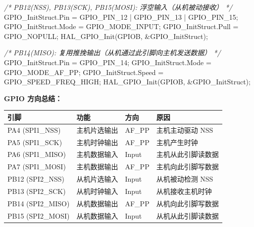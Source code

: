 \documentclass[
  chinese,
  UTF8,
  oneside,
  openany]{ctexbook}
\newenvironment{Shaded}{}{}
\newcommand{\CommentTok}[1]{\textcolor[rgb]{0.38,0.63,0.69}{\textit{#1}}}
\newcommand{\NormalTok}[1]{#1}
\newcommand{\OperatorTok}[1]{\textcolor[rgb]{0.40,0.40,0.40}{#1}}
\begin{document}
\begin{Shaded}
\begin{Highlighting}[]
\CommentTok{/* PB12(NSS), PB13(SCK), PB15(MOSI): 浮空输入（从机被动接收） */}
\NormalTok{GPIO\_InitStruct}\OperatorTok{.}\NormalTok{Pin   }\OperatorTok{=}\NormalTok{ GPIO\_PIN\_12 }\OperatorTok{|}\NormalTok{ GPIO\_PIN\_13 }\OperatorTok{|}\NormalTok{ GPIO\_PIN\_15}\OperatorTok{;}
\NormalTok{GPIO\_InitStruct}\OperatorTok{.}\NormalTok{Mode  }\OperatorTok{=}\NormalTok{ GPIO\_MODE\_INPUT}\OperatorTok{;}
\NormalTok{GPIO\_InitStruct}\OperatorTok{.}\NormalTok{Pull  }\OperatorTok{=}\NormalTok{ GPIO\_NOPULL}\OperatorTok{;}
\NormalTok{HAL\_GPIO\_Init}\OperatorTok{(}\NormalTok{GPIOB}\OperatorTok{,} \OperatorTok{\&}\NormalTok{GPIO\_InitStruct}\OperatorTok{);}

\CommentTok{/* PB14(MISO): 复用推挽输出（从机通过此引脚向主机发送数据） */}
\NormalTok{GPIO\_InitStruct}\OperatorTok{.}\NormalTok{Pin   }\OperatorTok{=}\NormalTok{ GPIO\_PIN\_14}\OperatorTok{;}
\NormalTok{GPIO\_InitStruct}\OperatorTok{.}\NormalTok{Mode  }\OperatorTok{=}\NormalTok{ GPIO\_MODE\_AF\_PP}\OperatorTok{;}
\NormalTok{GPIO\_InitStruct}\OperatorTok{.}\NormalTok{Speed }\OperatorTok{=}\NormalTok{ GPIO\_SPEED\_FREQ\_HIGH}\OperatorTok{;}
\NormalTok{HAL\_GPIO\_Init}\OperatorTok{(}\NormalTok{GPIOB}\OperatorTok{,} \OperatorTok{\&}\NormalTok{GPIO\_InitStruct}\OperatorTok{);}
\end{Highlighting}
\end{Shaded}

\textbf{GPIO 方向总结：}

\begin{longtable}[]{@{}llll@{}}
\toprule\noalign{}
引脚 & 功能 & 方向 & 原因 \\
\midrule\noalign{}
\endhead
\bottomrule\noalign{}
\endlastfoot
PA4 (SPI1\_NSS) & 主机片选输出 & AF\_PP & 主机主动驱动 NSS \\
PA5 (SPI1\_SCK) & 主机时钟输出 & AF\_PP & 主机产生时钟 \\
PA6 (SPI1\_MISO) & 主机数据输入 & Input & 主机从此引脚读数据 \\
PA7 (SPI1\_MOSI) & 主机数据输出 & AF\_PP & 主机向此引脚写数据 \\
PB12 (SPI2\_NSS) & 从机片选输入 & Input & 从机被动检测 NSS \\
PB13 (SPI2\_SCK) & 从机时钟输入 & Input & 从机接收主机时钟 \\
PB14 (SPI2\_MISO) & 从机数据输出 & AF\_PP & 从机向此引脚写数据 \\
PB15 (SPI2\_MOSI) & 从机数据输入 & Input & 从机从此引脚读数据 \\
\end{longtable}
\end{document}
